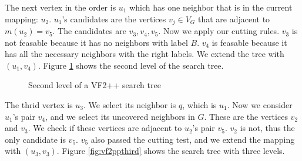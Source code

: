 \begin{example}
    The next vertex in the order is $u_1$ which has one neighbor that is in the current mapping: $u_2$. $u_1$'s candidates are the vertices $v_j \in V_G$
    that are adjacent to $m(u_2) = v_5$. The candidates are $v_3, v_4, v_5$. Now we apply our cutting rules. $v_3$ is not feasable because it has no neighbors
    with label $B$. $v_4$ is feasable because it has all the necessary neighbors with the right labels. We extend the tree with $(u_1, v_4)$. Figure \ref{fig:vf2ppsnd}
    shows the second level of the search tree.

    \begin{figure}[h!]
        \centering
        \caption{Second level of a VF2++ search tree}
        \label{fig:vf2ppsnd}
    \end{figure}

    The thrid vertex is $u_3$. We select its neighbor is $q$, which is $u_1$. Now we consider $u_1$'s pair $v_4$, and we select its uncovered neighbors in $G$.
    These are the vertices $v_2$ and $v_3$. We check if these vertices are adjacent to $u_2$'s pair $v_5$. $v_2$ is not, thus the only candidate is $v_5$. $v_5$ 
    also passed the cutting test, and we extend the mapping with $(u_3, v_3)$. Figure \ref{fig:vf2ppthird} shows the search tree with three levels.


\end{example}
